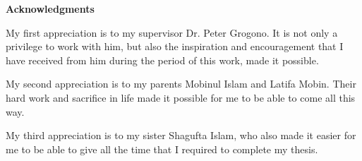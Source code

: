 \newpage
{}
\label{acknowledgments}
\begin{center}
\Large \textbf{Acknowledgments}\\[0.5cm]
\end{center}

My first appreciation is to my supervisor Dr. Peter Grogono. It is not only a privilege to work with him, but also the inspiration and encouragement that I have received from him during the period of this work, made it possible.

My second appreciation is to my parents Mobinul Islam and Latifa Mobin. Their hard work and sacrifice in life made it possible for me to be able to come all this way.

My third appreciation is to my sister Shagufta Islam, who also made it easier for me to be able to give all the time that I required to complete my thesis.
